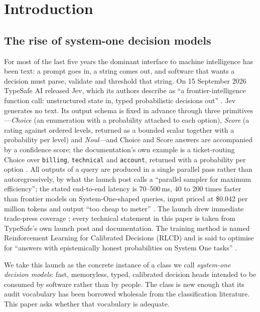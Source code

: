 \documentclass[11pt,a4paper]{article}
\numberwithin{equation}{section}
\theoremstyle{plain}
\theoremstyle{definition}
\theoremstyle{remark}
\begin{document}
\section{Introduction}\label{sec:intro}

\subsection{The rise of system-one decision models}

For most of the last five years the dominant interface to machine intelligence has been text: a prompt goes in, a string comes out, and software that wants a decision must parse, validate and threshold that string. On 15 September 2026 TypeSafe AI released Jev, which its authors describe as ``a frontier-intelligence function call: unstructured state in, typed probabilistic decisions out'' \citep{almeida2026jev}. Jev generates no text. Its output schema is fixed in advance through three primitives---\emph{Choice} (an enumeration with a probability attached to each option), \emph{Score} (a rating against ordered levels, returned as a bounded scalar together with a probability per level) and \emph{Noul}---and Choice and Score answers are accompanied by a confidence score; the documentation's own example is a ticket-routing Choice over \texttt{billing}, \texttt{technical} and \texttt{account}, returned with a probability per option \citep{typesafe2026docs}. All outputs of a query are produced in a single parallel pass rather than autoregressively, by what the launch post calls a ``parallel sampler for maximum efficiency''; the stated end-to-end latency is 70--500\,ms, 40 to 200 times faster than frontier models on System-One-shaped queries, input priced at \$0.042 per million tokens and output ``too cheap to meter'' \citep{almeida2026jev}. The launch drew immediate trade-press coverage \citep{claburn2026register}; every technical statement in this paper is taken from TypeSafe's own launch post and documentation. The training method is named Reinforcement Learning for Calibrated Decisions (RLCD) and is said to optimise for ``answers with epistemically honest probabilities on System One tasks'' \citep{almeida2026jev}.

We take this launch as the concrete instance of a class we call \emph{system-one decision models}: fast, memoryless, typed, calibrated decision heads intended to be consumed by software rather than by people. The class is new enough that its audit vocabulary has been borrowed wholesale from the classification literature. This paper asks whether that vocabulary is adequate.
\end{document}
